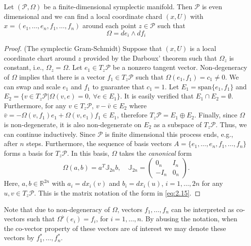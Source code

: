 \begin{corollary} \label{theorem:2.7}
Let $(\mathcal P, \Omega)$ be a finite-dimensional symplectic manifold. Then $\mathcal P$ is even dimensional and we can find a local coordinate chard $(x,U)$ with $x=(e_1,\dots,e_n,f_1,\dots,f_n)$ around each point $z\in \mathcal P$ such that
\begin{equation} \label{eq:2.15}
	\Omega = de_i\wedge df_i
\end{equation}
\end{corollary}
\begin{proof}
(The symplectic Gram-Schmidt) Suppose that $(x,U)$ is a local coordinate chart around $z$ provided by the Darboux' theorem such that $\Omega_z$ is constant, i.e., $\Omega_z = \Omega$. Let $e_1\in T_z\mathcal P$ be a nonzero tangent vector. Non-degeneracy of $\Omega$ implies that there is a vector $f_1\in T_z\mathcal P$ such that $\Omega(e_1,f_1) = c_1 \neq 0$. We can swap and scale $e_1$ and $f_1$ to guarantee that $c_1 = 1$. Let $E_1 = \text{span}\{e_1,f_1\}$ and $E_2 = \{v\in T_z\mathcal P | \Omega(v,e) = 0,~ \forall e \in E_1\}$. It is easily verified that $E_1\cap E_2 = \emptyset$. Furthermore, for any $v\in T_z\mathcal P$, $v - \bar v \in E_2$ where $\bar v = -\Omega(v,f_1)e_1 + \Omega(v,e_1)f_1 \in E_1$, therefore $T_z\mathcal P = E_1 \oplus E_2$. Finally, since $\Omega$ is non-degenerate, it is also non-degenerate on $E_2$ as a subspace of $T_z\mathcal P$. Thus, we can continue inductively. Since $\mathcal P$ is finite dimensional this process ends, e.g., after $n$ steps. Furthermore, the sequence of basis vectors $A = \{ e_1,\dots,e_n,f_1,\dots,f_n\}$ forms a basis for $T_z\mathcal P$. In this basis, $\Omega$ takes the \emph{canonical} form
\begin{equation} \label{eq:2.141}
	\Omega( a, b) = a^T\mathbb J_{2n}b, \quad \mathbb J_{2n} =
	\begin{pmatrix}
		0_n & I_n \\
		-I_n & 0_n
	\end{pmatrix}.
\end{equation}
Here, $a,b\in \mathbb R^{2n}$ with $a_i = dx_i(v)$ and $b_i = dx_i(u)$, $i=1,\dots,2n$ for any $u,v \in T_z\mathcal P$. This is the matrix notation of the form in \cref{eq:2.15}.
\end{proof}

Note that due to non-degeneracy of $\Omega$, vectors $f_1,\dots,f_n$ can be interpreted as co-vectors such that $\Omega^{\flat}(e_i)=f_i$, for $i=1,\dots,n$. By abusing the notation, when the co-vector property of these vectors are of interest we may denote these vectors by $f^*_1,\dots,f^*_n$.

